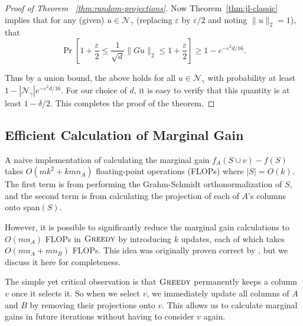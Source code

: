 \documentclass{article}
\newcommand{\eps}{\varepsilon}
\newcommand{\norm}[1]{\lVert #1 \rVert}
\newcommand{\calN}{\mathcal{N}}
\newcommand{\greedy}{\textsc{Greedy}}
\begin{document}
\begin{proof}[Proof of Theorem ~\ref{thm:random-projections}]
Now Theorem~\ref{thm:jl-classic} implies that for any (given) $u \in
\calN_\gamma$ (replacing $\eps$ by $\eps/2$ and noting $\norm{u}_2 =
1$), that
\[ \Pr \left[  1+ \frac{\eps}{2} \le \frac{1}{\sqrt{d}} \norm{Gu}_2 \le 1+\frac{\eps}{2} \right] \ge 1- e^{-\eps^2 d/16}.\]

Thus by a union bound, the above holds for all $u \in \calN_\gamma$
with probability at least $1- |\calN_\gamma|e^{-\eps^2 d/16}$.
For our choice of $d$, it is easy to verify that this quantity is at
least $1-\delta/2$.  This completes the proof of the theorem.
\end{proof}

\subsection{Efficient Calculation of Marginal Gain}\label{sec:app:marginal}
A naive implementation of calculating the marginal gain $f_A(S \cup v) - f(S)$ takes $O(mk^2 + kmn_A)$ floating-point operations (FLOPs) where $|S| = O(k)$. The first term is from performing the Grahm-Schmidt orthonormalization of $S$, and the second term is from calculating the projection of each of $A$'s columns onto span$(S)$.

However, it is possible to significantly reduce the marginal gain calculations to $O(mn_A)$ FLOPs in $\greedy$ by introducing $k$ updates, each of which takes $O(mn_A + mn_B)$ FLOPs. This idea was originally proven correct by \cite{Farahat2}, but we discuss it here for completeness.

The simple yet critical observation is that $\greedy$ permanently keeps a column $v$ once it selects it. So when we select $v$, we immediately update all columns of $A$ and $B$ by removing their projections onto $v$. This allows us to calculate marginal gains in future iterations without having to consider $v$ again.
\end{document}
